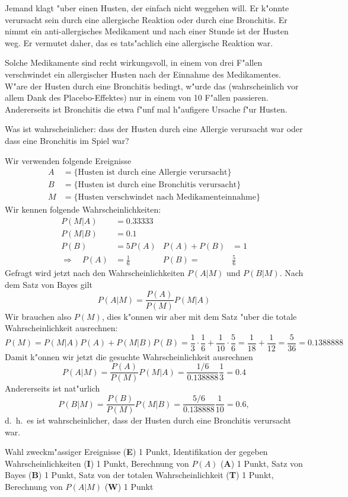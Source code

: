 %
%
Jemand klagt "uber einen Husten, der einfach nicht weggehen will.
Er k"onnte verursacht sein durch eine allergische Reaktion oder durch
eine Bronchitis. Er nimmt ein anti-allergisches Medikament und
nach einer Stunde ist der Husten weg. Er vermutet daher, das es tats"achlich
eine allergische Reaktion war.

Solche Medikamente sind recht wirkungsvoll, in einem von drei F"allen
verschwindet ein allergischer Husten nach der Einnahme des Medikamentes.
W"are der Husten durch eine Bronchitis bedingt, w"urde das (wahrscheinlich
vor allem Dank des Placebo-Effektes) nur in einem von 10 F"allen passieren.
Andererseits ist Bronchitis die etwa f"unf mal h"aufigere Ursache f"ur
Husten.

Was ist wahrscheinlicher: dass der Husten durch eine Allergie verursacht
war oder dass eine Bronchitis im Spiel war?

\begin{loesung}
Wir verwenden folgende Ereignisse
\begin{align*}
A&=\{\text{Husten ist durch eine Allergie verursacht}\}
\\
B&=\{\text{Husten ist durch eine Bronchitis verursacht}\}
\\
M&=\{\text{Husten verschwindet nach Medikamenteinnahme}\}
\end{align*}
Wir kennen folgende Wahrscheinlichkeiten:
\begin{align*}
P(M|A)&=0.33333\\
P(M|B)&=0.1\\
P(B)&=5P(A)&P(A)+P(B)&=1\\
\Rightarrow\quad P(A)&=\frac16&P(B)=&\frac56
\end{align*}
Gefragt wird jetzt nach den Wahrscheinlichkeiten $P(A|M)$ und $P(B|M)$.
Nach dem Satz von Bayes gilt
\[
P(A|M)=\frac{P(A)}{P(M)}P(M|A)
\]
Wir brauchen also $P(M)$, dies k"onnen wir aber mit dem Satz
"uber die totale Wahrscheinlichkeit ausrechnen:
\[
P(M)
=
P(M|A)P(A)+P(M|B)P(B)
=
\frac13\cdot\frac16+\frac1{10}\cdot\frac56
=
\frac1{18}+\frac1{12}=\frac{5}{36}
=
0.1388888
\]
Damit k"onnen wir jetzt die gesuchte Wahrscheinlichkeit ausrechnen
\[
P(A|M)
=
\frac{P(A)}{P(M)}P(M|A)
=
\frac{1/6}{0.138888}\frac13
=
0.4
\]
Andererseits ist nat"urlich
\[
P(B|M)
=
\frac{P(B)}{P(M)}P(M|B)
=
\frac{5/6}{0.138888}\frac1{10}
=
0.6,
\]
d.~h.~es ist wahrscheinlicher, dass der Husten durch eine Bronchitis
verursacht war.
\end{loesung}


\begin{bewertung}
Wahl zweckm"assiger Ereignisse ({\bf E}) 1 Punkt,
Identifikation der gegeben Wahrscheinlichkeiten ({\bf I}) 1 Punkt,
Berechnung von $P(A)$ ({\bf A}) 1 Punkt,
Satz von Bayes ({\bf B}) 1 Punkt,
Satz von der totalen Wahrscheinlichkeit ({\bf T}) 1 Punkt,
Berechnung von $P(A|M)$ ({\bf W}) 1 Punkt
\end{bewertung}


